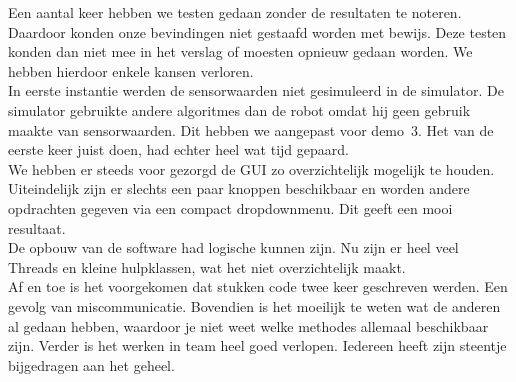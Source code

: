 \documentclass[eind]{penoverslag}
\begin{document}
Een aantal keer hebben we testen gedaan zonder de resultaten te noteren. Daardoor konden onze bevindingen niet gestaafd worden met bewijs. Deze testen konden dan niet mee in het verslag of moesten opnieuw gedaan worden. We hebben hierdoor enkele kansen verloren.\\

In eerste instantie werden de sensorwaarden niet gesimuleerd in de simulator. De simulator gebruikte andere algoritmes dan de robot omdat hij geen gebruik maakte van sensorwaarden. Dit hebben we aangepast voor demo~3. Het van de eerste keer juist doen, had echter heel wat tijd gepaard.\\

We hebben er steeds voor gezorgd de GUI zo overzichtelijk mogelijk te houden. Uiteindelijk zijn er slechts een paar knoppen beschikbaar en worden andere opdrachten gegeven via een compact dropdownmenu. Dit geeft een mooi resultaat.\\

De opbouw van de software had logische kunnen zijn. Nu zijn er heel veel Threads en kleine hulpklassen, wat het niet overzichtelijk maakt.\\

Af en toe is het voorgekomen dat stukken code twee keer geschreven werden. Een gevolg van miscommunicatie. Bovendien is het moeilijk te weten wat de anderen al gedaan hebben, waardoor je niet weet welke methodes allemaal beschikbaar zijn. Verder is het werken in team heel goed verlopen. Iedereen heeft zijn steentje bijgedragen aan het geheel.
\end{document}
